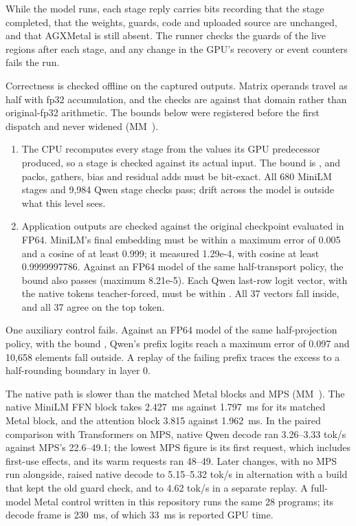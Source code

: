 While the model runs, each stage reply carries bits recording that the stage completed, that the weights, guards,
code and uploaded source are unchanged, and that AGXMetal is still absent. The runner checks the guards of the live
regions after each stage, and any change in the GPU's recovery or event counters fails the run.

Correctness is checked offline on the captured outputs. Matrix operands travel as half with fp32 accumulation, and the
checks are against that domain rather than original-fp32 arithmetic. The bounds below were registered before
the first dispatch and never widened (MM~).

\begin{enumerate}
\def\labelenumi{\arabic{enumi}.}
\item The CPU recomputes every stage from the values its GPU predecessor produced, so a stage is checked against
  its actual input. The bound is , and packs, gathers,
  bias and residual adds must be bit-exact. All 680 MiniLM stages and 9,984 Qwen stage checks pass; drift across the
  model is outside what this level sees.
\item Application outputs are checked against the original checkpoint evaluated in FP64. MiniLM's final embedding
  must be within a maximum error of 0.005 and a cosine of at least 0.999; it measured 1.29e-4, with cosine at least
  0.9999997786. Against an FP64 model of the same half-transport policy, the bound 
  also passes (maximum 8.21e-5). Each Qwen last-row logit vector, with the native tokens teacher-forced, must be within
  . All 37 vectors fall inside, and all 37 agree on the top token.
\end{enumerate}

One auxiliary control fails. Against an FP64 model of the same half-projection policy, with the bound
, Qwen's prefix logits reach a maximum error of 0.097 and 10,658 elements fall
outside. A replay of the failing prefix traces the excess to a half-rounding boundary in layer 0.

The native path is slower than the matched Metal blocks and MPS (MM~). The native MiniLM FFN block takes
2.427~ms against 1.797~ms for its matched Metal block, and the attention block 3.815 against 1.962~ms. In the paired
comparison with Transformers on MPS, native Qwen decode ran 3.26–3.33 tok/s against MPS's 22.6–49.1; the lowest MPS
figure is its first request, which includes first-use effects, and its warm requests ran 48–49. Later changes,
with no MPS run alongside, raised native decode to 5.15–5.32 tok/s in alternation with a build that kept the old guard
check, and to 4.62 tok/s in a separate replay. A full-model Metal control written in this repository runs the same 28
programs; its decode frame is 230~ms, of which 33~ms is reported GPU time.


